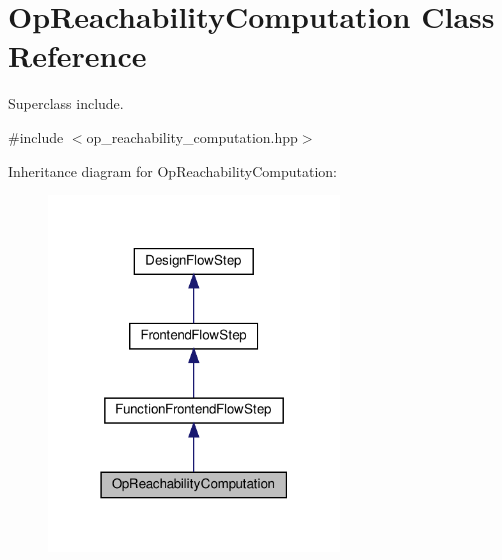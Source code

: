 \hypertarget{classOpReachabilityComputation}{}\section{Op\+Reachability\+Computation Class Reference}
\label{classOpReachabilityComputation}


Superclass include.  




{\ttfamily \#include $<$op\+\_\+reachability\+\_\+computation.\+hpp$>$}



Inheritance diagram for Op\+Reachability\+Computation\+:
\nopagebreak
\begin{figure}[H]
\begin{center}
\leavevmode
\includegraphics[width=219pt]{d1/d66/classOpReachabilityComputation__inherit__graph}
\end{center}
\end{figure}


